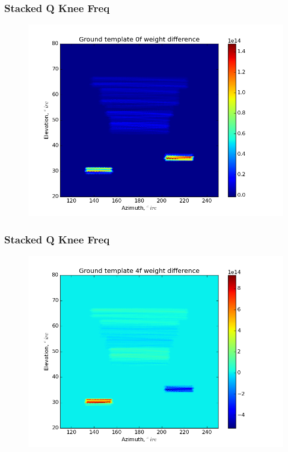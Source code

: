 \documentclass{beamer}
\begin{document}
\begin{frame}
\frametitle{Stacked Q Knee Freq}
\begin{figure}
\includegraphics[width=0.9\linewidth]{dw0_gt_STACK_Q_FKNEE.png}
\end{figure}
\end{frame}

\begin{frame}
\frametitle{Stacked Q Knee Freq}
\begin{figure}
\includegraphics[width=0.9\linewidth]{dw4_gt_STACK_Q_FKNEE.png}
\end{figure}
\end{frame}
\end{document}
